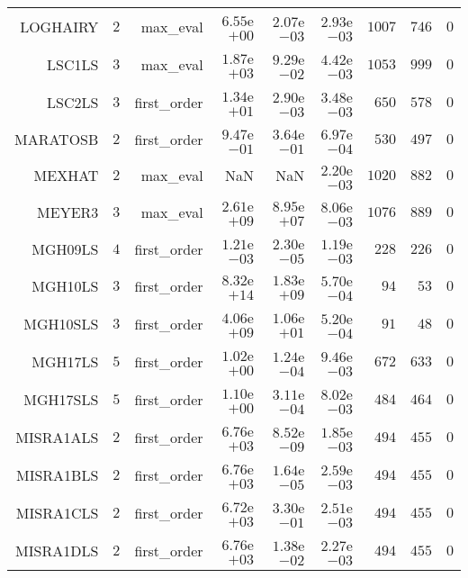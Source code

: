 \begin{longtable}{rrrrrrrrr}
LOGHAIRY & \(     2\) & max\_eval & \( 6.55\)e\(+00\) & \( 2.07\)e\(-03\) & \( 2.93\)e\(-03\) & \(  1007\) & \(   746\) & \(     0\) \\
LSC1LS & \(     3\) & max\_eval & \( 1.87\)e\(+03\) & \( 9.29\)e\(-02\) & \( 4.42\)e\(-03\) & \(  1053\) & \(   999\) & \(     0\) \\
LSC2LS & \(     3\) & first\_order & \( 1.34\)e\(+01\) & \( 2.90\)e\(-03\) & \( 3.48\)e\(-03\) & \(   650\) & \(   578\) & \(     0\) \\
MARATOSB & \(     2\) & first\_order & \( 9.47\)e\(-01\) & \( 3.64\)e\(-01\) & \( 6.97\)e\(-04\) & \(   530\) & \(   497\) & \(     0\) \\
MEXHAT & \(     2\) & max\_eval &       NaN &       NaN & \( 2.20\)e\(-03\) & \(  1020\) & \(   882\) & \(     0\) \\
MEYER3 & \(     3\) & max\_eval & \( 2.61\)e\(+09\) & \( 8.95\)e\(+07\) & \( 8.06\)e\(-03\) & \(  1076\) & \(   889\) & \(     0\) \\
MGH09LS & \(     4\) & first\_order & \( 1.21\)e\(-03\) & \( 2.30\)e\(-05\) & \( 1.19\)e\(-03\) & \(   228\) & \(   226\) & \(     0\) \\
MGH10LS & \(     3\) & first\_order & \( 8.32\)e\(+14\) & \( 1.83\)e\(+09\) & \( 5.70\)e\(-04\) & \(    94\) & \(    53\) & \(     0\) \\
MGH10SLS & \(     3\) & first\_order & \( 4.06\)e\(+09\) & \( 1.06\)e\(+01\) & \( 5.20\)e\(-04\) & \(    91\) & \(    48\) & \(     0\) \\
MGH17LS & \(     5\) & first\_order & \( 1.02\)e\(+00\) & \( 1.24\)e\(-04\) & \( 9.46\)e\(-03\) & \(   672\) & \(   633\) & \(     0\) \\
MGH17SLS & \(     5\) & first\_order & \( 1.10\)e\(+00\) & \( 3.11\)e\(-04\) & \( 8.02\)e\(-03\) & \(   484\) & \(   464\) & \(     0\) \\
MISRA1ALS & \(     2\) & first\_order & \( 6.76\)e\(+03\) & \( 8.52\)e\(-09\) & \( 1.85\)e\(-03\) & \(   494\) & \(   455\) & \(     0\) \\
MISRA1BLS & \(     2\) & first\_order & \( 6.76\)e\(+03\) & \( 1.64\)e\(-05\) & \( 2.59\)e\(-03\) & \(   494\) & \(   455\) & \(     0\) \\
MISRA1CLS & \(     2\) & first\_order & \( 6.72\)e\(+03\) & \( 3.30\)e\(-01\) & \( 2.51\)e\(-03\) & \(   494\) & \(   455\) & \(     0\) \\
MISRA1DLS & \(     2\) & first\_order & \( 6.76\)e\(+03\) & \( 1.38\)e\(-02\) & \( 2.27\)e\(-03\) & \(   494\) & \(   455\) & \(     0\) \\

\end{longtable}
